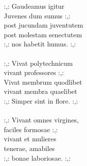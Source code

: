 
            :,: Gaudeamus igitur \\
            Juvenes dum sumus :,: \\
            post jucundam juventutem \\
            post molestam senectutem \\
            :,: nos habetit humus. :,: \\
\hspace{10mm} \\
            :,: Vivat polytechnicum \\
            vivant professores :,: \\
            Vivat membrum quodlibet \\
            vivant membra quaelibet \\
            :,: Simper sint in flore. :,: \\
\hspace{10mm} \\
            :,: Vivant omnes virgines, \\
            faciles formosae :,: \\
            vivant et mulieres \\
            tenerae, amabiles \\
            :,: bonae laboriosae. :,: \\
